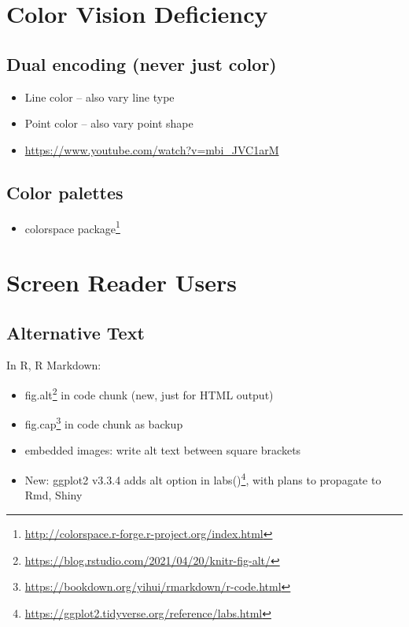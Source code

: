 \documentclass[
]{krantz}
\providecommand{\tightlist}{%
  \setlength{\itemsep}{0pt}\setlength{\parskip}{0pt}}
\renewcommand{\href}[2]{#2\footnote{\url{#1}}}
\begin{document}
\hypertarget{color-vision-deficiency}{%
\section{Color Vision Deficiency}\label{color-vision-deficiency}}

\hypertarget{dual-encoding-never-just-color}{%
\subsection{Dual encoding (never just color)}\label{dual-encoding-never-just-color}}

\begin{itemize}
\item
  Line color -- also vary line type
\item
  Point color -- also vary point shape
\item
  \url{https://www.youtube.com/watch?v=mbi_JVC1arM}
\end{itemize}

\hypertarget{color-palettes}{%
\subsection{Color palettes}\label{color-palettes}}

\begin{itemize}
\tightlist
\item
  \href{http://colorspace.r-forge.r-project.org/index.html}{colorspace package}
\end{itemize}

\hypertarget{screen-reader-users}{%
\section{Screen Reader Users}\label{screen-reader-users}}

\hypertarget{alternative-text}{%
\subsection{Alternative Text}\label{alternative-text}}

In R, R Markdown:

\begin{itemize}
\item
  \href{https://blog.rstudio.com/2021/04/20/knitr-fig-alt/}{fig.alt} in code chunk (new, just for HTML output)
\item
  \href{https://bookdown.org/yihui/rmarkdown/r-code.html}{fig.cap} in code chunk as backup
\item
  embedded images: write alt text between square brackets
\item
  New: ggplot2 v3.3.4 adds \href{https://ggplot2.tidyverse.org/reference/labs.html}{alt option in labs()}, with plans to propagate to Rmd, Shiny
\end{itemize}
\end{document}
